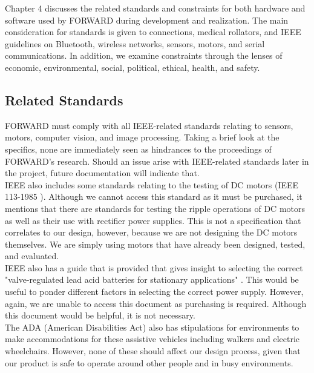\noindent Chapter 4 discusses the related standards and constraints for both hardware and software used by FORWARD during development and realization. The main consideration for standards is given to connections, medical rollators, and IEEE guidelines on Bluetooth, wireless networks, sensors, motors, and serial communications. In addition, we examine constraints through the lenses of economic, environmental, social, political, ethical, health, and safety.

\subsection{Related Standards}
\noindent FORWARD must comply with all IEEE-related standards relating to sensors, motors, computer vision, and image processing. Taking a brief look at the specifics, none are immediately seen as hindrances to the proceedings of FORWARD’s research. Should an issue arise with IEEE-related standards later in the project, future documentation will indicate that. \\

\noindent IEEE also includes some standards relating to the testing of DC motors (IEEE 113-1985 \cite{ieee113277}). Although we cannot access this standard as it must be purchased, it mentions that there are standards for testing the ripple operations of DC motors as well as their use with rectifier power supplies. This is not a specification that correlates to our design, however, because we are not designing the DC motors themselves. We are simply using motors that have already been designed, tested, and evaluated.\\

\noindent IEEE also has a guide that is provided that gives insight to selecting the correct "valve-regulated lead acid batteries for stationary applications" \cite{ieee11893242}. This would be useful to ponder different factors in selecting the correct power supply. However, again, we are unable to access this document as purchasing is required. Although this document would be helpful, it is not necessary.\\

\noindent The ADA (American Disabilities Act) also has stipulations for environments to make accommodations for these assistive vehicles including walkers and electric wheelchairs. However, none of these should affect our design process, given that our product is safe to operate around other people and in busy environments.\\

